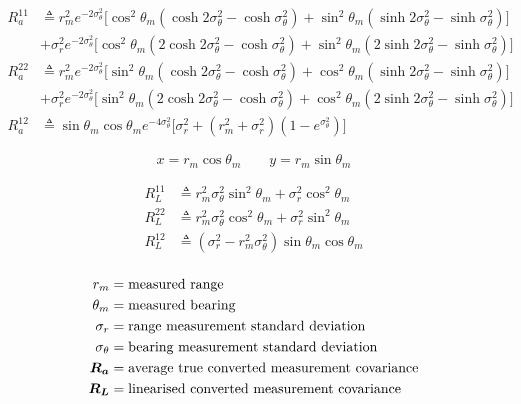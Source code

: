 \begin{equation}\label{eq:average_true_converted_measurement_covariace}
\begin{split}
R_a^{11} & \triangleq r_m^2 e^{-2\sigma_\theta^2} \lbrack \cos^2\theta_m(\cosh 2\sigma_\theta^2-\cosh \sigma_\theta^2) + \sin^2\theta_m (\sinh 2\sigma_\theta^2 - \sinh \sigma_\theta^2) \rbrack \\
& + \sigma_r^2 e^{-2\sigma_\theta^2} \lbrack \cos^2 \theta_m (2\cosh 2\sigma_\theta^2 - \cosh\sigma_\theta^2) + \sin^2 \theta_m (2\sinh 2\sigma_\theta^2 - \sinh \sigma_\theta^2) \rbrack \\
R_a^{22} & \triangleq r_m^2 e^{-2\sigma_\theta^2} \lbrack \sin^2\theta_m(\cosh 2\sigma_\theta^2-\cosh \sigma_\theta^2) + \cos^2\theta_m (\sinh 2\sigma_\theta^2 - \sinh \sigma_\theta^2) \rbrack \\
& + \sigma_r^2 e^{-2\sigma_\theta^2} \lbrack \sin^2 \theta_m (2\cosh 2\sigma_\theta^2 - \cosh\sigma_\theta^2) + \cos^2 \theta_m (2\sinh 2\sigma_\theta^2 - \sinh \sigma_\theta^2) \rbrack \\
R_a^{12} & \triangleq \sin \theta_m \cos \theta_m e^{-4\sigma_\theta^2} \lbrack \sigma_r^2 + (r_m^2 + \sigma_r^2)(1-e^{\sigma_\theta^2}) \rbrack
\end{split}
\end{equation}

\begin{equation}\label{eq:standard_coordinate_conversion}
x = r_m \cos \theta_m \qquad y = r_m \sin \theta_m
\end{equation}

\begin{equation}\label{eq:linearized_converted_measurement_covariace}
\begin{split}
R_L^{11} & \triangleq r_m^2 \sigma_\theta^2 \sin^2\theta_m + \sigma_r^2 \cos^2 \theta_m \\
R_L^{22} & \triangleq r_m^2 \sigma_\theta^2 \cos^2\theta_m + \sigma_r^2 \sin^2 \theta_m \\
R_L^{12} & \triangleq (\sigma_r^2 - r_m^2 \sigma_\theta^2) \sin \theta_m \cos \theta_m \\
\end{split}
\end{equation}

\begin{equation*}
\begin{split}
r_m 			&= \text{measured range} \\
\theta_m		&= \text{measured bearing} \\
\sigma_r 		&= \text{range measurement standard deviation} \\
\sigma_\theta 	&= \text{bearing measurement standard deviation} \\
\bm{R_a} 		&= \text{average true converted measurement covariance} \\
\bm{R_L} 		&= \text{linearised converted measurement covariance} \\
\end{split}
\end{equation*}

